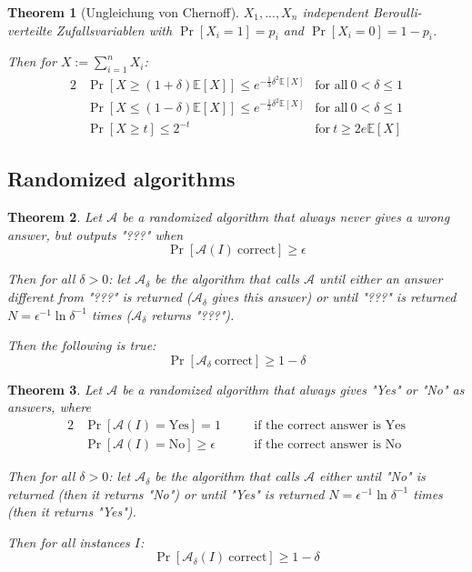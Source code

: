 \documentclass[12pt]{extarticle}
\theoremstyle{definition}
\theoremstyle{remark}
\theoremstyle{plain}
\newtheorem{theorem}{Theorem}
\theoremstyle{plain}
\theoremstyle{plain}
\newcommand{\E}{\mathbb{E}}
\begin{document}
\begin{theorem}[Ungleichung von Chernoff]
    $X_1, ..., X_n$ independent Beroulli-verteilte Zufallsvariablen with $\Pr[X_i = 1] = p_i$ and $\Pr[X_i = 0] = 1 - p_i$.

    Then for $X := \sum_{i=1}^n X_i$:
    \begin{alignat}{2}
         & \Pr[X \ge (1 + \delta)\E[X]] \le e^{-\frac{1}{3} \delta^2 \E[X]} & \mbox{for all}\ 0 < \delta \le 1 \\
         & \Pr[X \le (1 - \delta)\E[X]] \le e^{-\frac{1}{2} \delta^2 \E[X]} & \mbox{for all}\ 0 < \delta \le 1 \\
         & \Pr[X \ge t] \le 2^{-t}                                          & \mbox{for}\ t \ge 2e \E[X]
    \end{alignat}
\end{theorem}

\subsection{Randomized algorithms}
\begin{theorem}
    Let $\mathcal{A}$ be a randomized algorithm that always never gives a wrong answer, but outputs "???" when
    \[ \Pr[\mathcal{A}(I)\ \mbox{correct}] \ge \epsilon \]

    Then for all $\delta > 0$:
    let $\mathcal{A}_\delta$ be the algorithm that calls $\mathcal{A}$ until either an answer different from "???" is returned ($\mathcal{A}_\delta$ gives
    this answer) or until "???" is returned $N = \epsilon^{-1} \ln \delta^{-1}$ times ($\mathcal{A}_\delta$ returns "???").

    Then the following is true:
    \[ \Pr[\mathcal{A}_\delta\ \mbox{correct}] \ge 1 - \delta \]
\end{theorem}

\begin{theorem}
    Let $\mathcal{A}$ be a randomized algorithm that always gives "Yes" or "No" as answers, where
    \begin{alignat}{2}
         & \Pr[\mathcal{A}(I) = \mbox{Yes}] = 1         &  & \quad\mbox{if the correct answer is Yes} \\
         & \Pr[\mathcal{A}(I) = \mbox{No}] \ge \epsilon &  & \quad\mbox{if the correct answer is No}
    \end{alignat}

    Then for all $\delta > 0$: let $\mathcal{A}_\delta$ be the algorithm that calls $\mathcal{A}$ either until "No" is returned
    (then it returns "No") or until "Yes" is returned $N = \epsilon^{-1} \ln \delta^{-1}$ times (then it returns "Yes").

    Then for all instances $I$:
    \[ \Pr[\mathcal{A}_\delta(I)\ \mbox{correct}] \ge 1 - \delta \]
\end{theorem}
\end{document}
